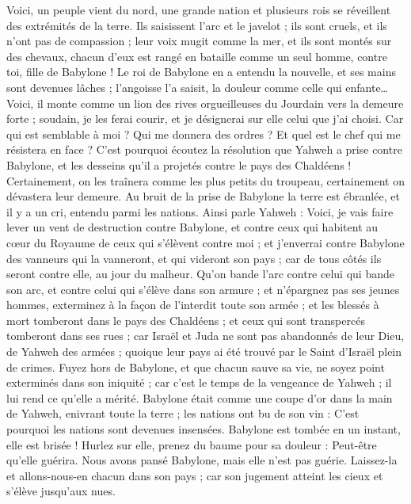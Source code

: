\begin{multicols}{2}
Voici, un peuple vient du nord, une grande nation et plusieurs rois se réveillent des extrémités de la terre.
Ils saisissent l'arc et le javelot ; ils sont cruels, et ils n'ont pas de compassion ; leur voix mugit comme la mer, et ils sont montés sur des chevaux, chacun d'eux est rangé en bataille comme un seul homme, contre toi, fille de Babylone !
Le roi de Babylone en a entendu la nouvelle, et ses mains sont devenues lâches ; l'angoisse l'a saisit, la douleur comme celle qui enfante…
Voici, il monte comme un lion des rives orgueilleuses du Jourdain vers la demeure forte ; soudain, je les ferai courir, et je désignerai sur elle celui que j'ai choisi. Car qui est semblable à moi ? Qui me donnera des ordres ? Et quel est le chef qui me résistera en face ?
C'est pourquoi écoutez la résolution que Yahweh a prise contre Babylone, et les desseins qu'il a projetés contre le pays des Chaldéens ! Certainement, on les traînera comme les plus petits du troupeau, certainement on dévastera leur demeure.
Au bruit de la prise de Babylone la terre est ébranlée, et il y a un cri, entendu parmi les nations.
\VerseOne{}Ainsi parle Yahweh : Voici, je vais faire lever un vent de destruction contre Babylone, et contre ceux qui habitent au cœur du Royaume de ceux qui s’élèvent contre moi ;
et j'enverrai contre Babylone des vanneurs qui la vanneront, et qui videront son pays ; car de tous côtés ils seront contre elle, au jour du malheur.
Qu'on bande l'arc contre celui qui bande son arc, et contre celui qui s'élève dans son armure ; et n'épargnez pas ses jeunes hommes, exterminez à la façon de l'interdit toute son armée ;
et les blessés à mort tomberont dans le pays des Chaldéens ; et ceux qui sont transpercés tomberont dans ses rues ;
car Israël et Juda ne sont pas abandonnés de leur Dieu, de Yahweh des armées ; quoique leur pays ai été trouvé par le Saint d'Israël plein de crimes.
Fuyez hors de Babylone, et que chacun sauve sa vie, ne soyez point exterminés dans son iniquité ; car c'est le temps de la vengeance de Yahweh ; il lui rend ce qu'elle a mérité.
Babylone était comme une coupe d'or dans la main de Yahweh, enivrant toute la terre ; les nations ont bu de son vin : C'est pourquoi les nations sont devenues insensées.
Babylone est tombée en un instant, elle est brisée ! Hurlez sur elle, prenez du baume pour sa douleur : Peut-être qu'elle guérira.
Nous avons pansé Babylone, mais elle n'est pas guérie. Laissez-la et allons-nous-en chacun dans son pays ; car son jugement atteint les cieux et s'élève jusqu'aux nues.

\end{multicols}
